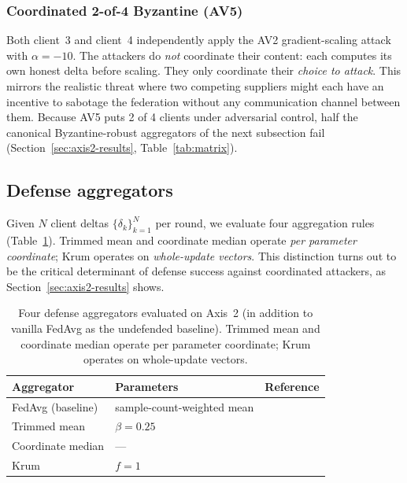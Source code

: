 \documentclass[a4paper,fleqn,doubleblind]{cas-sc}
\newcommand{\tblhead}{\rowcolor{tblHeadBg}}
\newcommand{\zebra}{\rowcolors{2}{tblAltBg}{white}}
\newcommand{\tblhead}{}
\newcommand{\zebra}{}
\begin{document}
\subsubsection{Coordinated 2-of-4 Byzantine (AV5)}
\label{subsec:coord}

Both client~3 and client~4 independently apply the AV2
gradient-scaling attack with $\alpha = -10$. The attackers do
\emph{not} coordinate their content: each computes its own honest
delta before scaling. They only coordinate their \emph{choice to
attack}. This mirrors the realistic threat where two competing
suppliers might each have an incentive to sabotage the federation
without any communication channel between them. Because AV5 puts
2 of 4 clients under adversarial control, half the canonical
Byzantine-robust aggregators of the next subsection fail
(Section~\ref{sec:axis2-results}, Table~\ref{tab:matrix}).

\subsection{Defense aggregators}
\label{subsec:defenses}

Given $N$ client deltas $\{\delta_k\}_{k=1}^N$ per round, we
evaluate four aggregation rules (Table~\ref{tab:defenses}).
Trimmed mean and coordinate median operate
\emph{per parameter coordinate}; Krum operates on
\emph{whole-update vectors}. This distinction turns out to be the
critical determinant of defense success against coordinated
attackers, as Section~\ref{sec:axis2-results} shows.

\begin{table}[pos=tbp]
\centering
\footnotesize
\setlength{\tabcolsep}{6pt}
\renewcommand{\arraystretch}{1.15}
\caption{Four defense aggregators evaluated on Axis~2 (in addition
to vanilla FedAvg as the undefended baseline). Trimmed mean and
coordinate median operate per parameter coordinate; Krum operates
on whole-update vectors.}
\label{tab:defenses}
\zebra
\begin{tabular}{@{}l l l@{}}
\toprule
\tblhead
Aggregator & Parameters & Reference \\
\midrule
FedAvg (baseline)    & sample-count-weighted mean & \citet{McMahan2017FedAvg} \\
Trimmed mean         & $\beta = 0.25$             & \citet{Yin2018RobustDistributed} \\
Coordinate median    & ---                         & \citet{Yin2018RobustDistributed} \\
Krum                 & $f = 1$                    & \citet{Blanchard2017Krum} \\
\bottomrule
\end{tabular}
\end{table}
\end{document}
